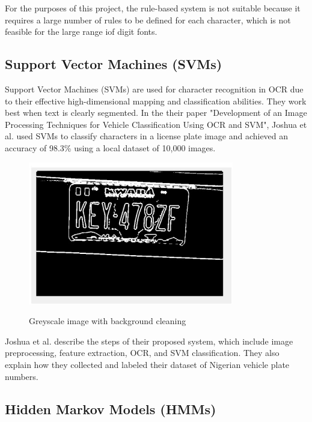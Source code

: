 For the purposes of this project, the rule-based system is not suitable because it requires a large number of rules to be defined for each character, which is not feasible for the large range iof digit fonts.


\newpage

\subsection{Support Vector Machines (SVMs)}

Support Vector Machines (SVMs) are used for character recognition in OCR due to their effective high-dimensional mapping and classification abilities. They work best when text is clearly segmented. In the their paper "Development of an Image Processing Techniques for Vehicle Classification Using OCR and SVM", Joshua et al. used SVMs to classify characters in a license plate image and achieved an accuracy of 98.3\% using a local dataset of 10,000 images.\cite{joshuaDevelopmentImageProcessing2023}

\begin{figure}[ht]
    \centering
    \includegraphics[width=0.8\textwidth]{Figures/SVM_Joshua.jpg}
    \caption[Development of an Image Processing Technique for Vehicle Classification using OCR and SVM]{Greyscale image with background cleaning}\cite{joshuaDevelopmentImageProcessing2023}
    \label{fig:Joshua SVM Paper}
\end{figure}

Joshua et al. describe the steps of their proposed system, which include image preprocessing, feature extraction, OCR, and SVM classification. They also explain how they collected and labeled their dataset of Nigerian vehicle plate numbers.

\newpage

\subsection{Hidden Markov Models (HMMs)}


